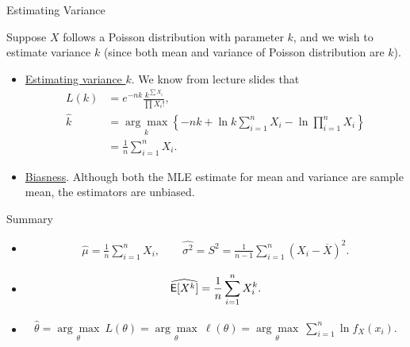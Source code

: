 \begin{frame}{Estimating Variance}

\justifying
{} Suppose $X$ follows a Poisson distribution with parameter $k$, and we wish to estimate variance $k$ (since both mean and variance of Poisson distribution are $k$).
\begin{itemize}
	\justifying
	\item \underline{Estimating variance $k$}. We know from lecture slides that
	\footnotesize
	\begin{align*}
	L(k) & = e^{-nk} \frac{k^{\sum X_i}}{\prod X_i!}, \\
	\widehat{k} & = \underset{k}{\arg\max}\left\{-nk + \ln k\sum_{i=1}^n X_i - \ln\prod_{i=1}^n X_i \right\} \\
	& = \frac{1}{n}\sum_{i=1}^n X_i.
	\end{align*}
	\normalsize
	\item \underline{Biasness}. Although both the MLE estimate for mean and variance are sample mean, the estimators are unbiased.
\end{itemize}

\end{frame}

\begin{frame}{Summary}

\begin{itemize}
	\justifying
	\item {} 
	\begin{align*}
	\widehat{\mu} = \frac{1}{n}\sum_{i=1}^n X_i, \qquad \widehat{\sigma^2} = S^2 = \frac{1}{n-1}\sum_{i=1}^n (X_i - \overline{X})^2.
	\end{align*}
	\item {}
	\begin{align*}
	\widehat{\mathsf{E}[X^k]} = \frac{1}{n}\sum_{i=1}^n X_i^k.
	\end{align*}
	\item {}
	\begin{align*}
	\widehat{\theta} = \underset{\theta}{\arg\max}\ L(\theta) = \underset{\theta}{\arg\max}\ \ell(\theta) = \underset{\theta}{\arg\max}\ \sum_{i=1}^n \ln f_{X}(x_i).
	\end{align*}
\end{itemize}


\end{frame}


